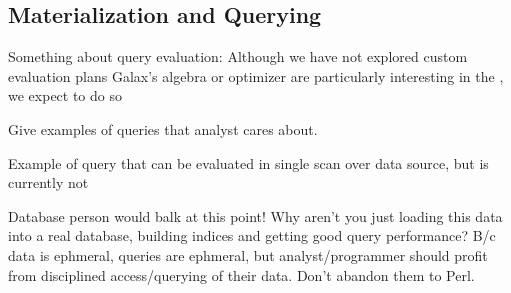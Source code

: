 







\subsection{Materialization and Querying}

Something about query evaluation:
Although we have not explored custom evaluation plans 
Galax's algebra or optimizer are particularly interesting in the 
\padx{}, we expect to do so 

Give examples of queries that analyst cares about. 

Example of query that can be evaluated in single scan over data
source, but is currently not 

Database person would balk at this point!  Why aren't you just loading
this data into a real database, building indices and getting good
query performance?  B/c data is ephmeral, queries are ephmeral, but
analyst/programmer should profit from disciplined access/querying of
their data.  Don't abandon them to Perl. 


